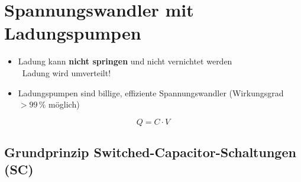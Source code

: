 \section{Spannungswandler mit Ladungspumpen}

\begin{minipage}[c]{0.72\columnwidth}
    \begin{itemize}
        \item Ladung kann \textbf{nicht springen} und nicht vernichtet werden \\
            \textrightarrow\ Ladung wird umverteilt!
        \item Ladungspumpen sind billige, effiziente Spannungswandler (Wirkungsgrad $> 99 \, \%$ möglich)
    \end{itemize}
\end{minipage}
\hfill
\begin{minipage}[b]{0.25\columnwidth}
    $$ \boxed{ Q = C \cdot V} $$
\end{minipage}


\subsection{Grundprinzip Switched-Capacitor-Schaltungen (SC)}

